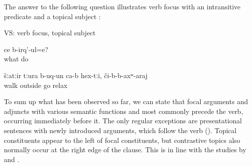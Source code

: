 The answer to the following question illustrates verb focus with an intransitive predicate and a topical subject :
%
\begin{exe}
	\ex	VS: verb focus, topical subject	\label{ex:What are (they) doing They went for a walk, to relax}
	\begin{xlist}
		\ex	\label{ex:What are (they) doing Q}
		\gll	ce	b-irq'-ul=e?\\
			what	do\\
		\glt	{}

		\ex	\label{ex:They went for a walk, to relax A}
		\gll	šːatːir	tːura	b-uq-un ca-b	hex-tːi,		či-b-b-axʷ-araj\\
			walk	outside	go			relax\\
		\glt	{}
	\end{xlist}
\end{exe}

To sum up what has been observed so far, we can state that focal arguments and adjuncts with various semantic functions and  most commonly precede the verb, occurring immediately before it.  The only regular exceptions are presentational sentences with newly introduced arguments, which follow the verb (). Topical constituents appear to the left of focal constituents, but contrastive topics also normally occur at the right edge of the clause. This is in line with the studies by \citet{Testelec1998a, Testelec1998b} and \citet{Forker.Belyaev2016}.

